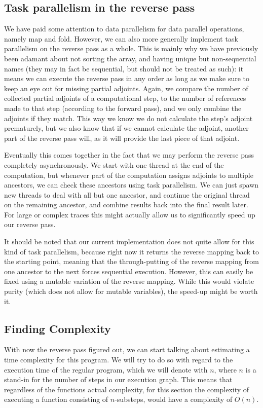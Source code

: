     \subsection{Task parallelism in the reverse pass}
        We have paid some attention to data parallelism for data parallel operations, namely map and fold.
        However, we can also more generally implement task parallelism on the reverse pass as a whole.
        This is mainly why we have previously been adamant about not sorting the array, and having unique but non-sequential names (they may in fact be sequential, but should not be treated as such): it means we can execute the reverse pass in any order as long as we make sure to keep an eye out for missing partial adjoints.
        Again, we compare the number of collected partial adjoints of a computational step, to the number of references made to that step (according to the forward pass), and we only combine the adjoints if they match.
        This way we know we do not calculate the step's adjoint prematurely, but we also know that if we cannot calculate the adjoint, another part of the reverse pass will, as it will provide the last piece of that adjoint.

        Eventually this comes together in the fact that we may perform the reverse pass completely asynchronously.
        We start with one thread at the end of the computation, but whenever part of the computation assigns adjoints to multiple ancestors, we can check these ancestors using task parallelism.
        We can just spawn new threads to deal with all but one ancestor, and continue the original thread on the remaining ancestor, and combine results back into the final result later.
        For large or complex traces this might actually allow us to significantly speed up our reverse pass.

        It should be noted that our current implementation does not quite allow for this kind of task parallelism, because right now it returns the reverse mapping back to the starting point, meaning that the through-putting of the reverse mapping from one ancestor to the next forces sequential execution.
        However, this can easily be fixed using a mutable variation of the reverse mapping.
        While this would violate purity (which does not allow for mutable variables), the speed-up might be worth it.

    \subsection{Finding Complexity}
        With now the reverse pass figured out, we can start talking about estimating a time complexity for this program.
        We will try to do so with regard to the execution time of the regular program, which we will denote with $n$, where $n$ is a stand-in for the number of steps in our execution graph.
        This means that regardless of the functions actual complexity, for this section the complexity of executing a function consisting of $n$-substeps, would have a complexity of $O(n)$.

